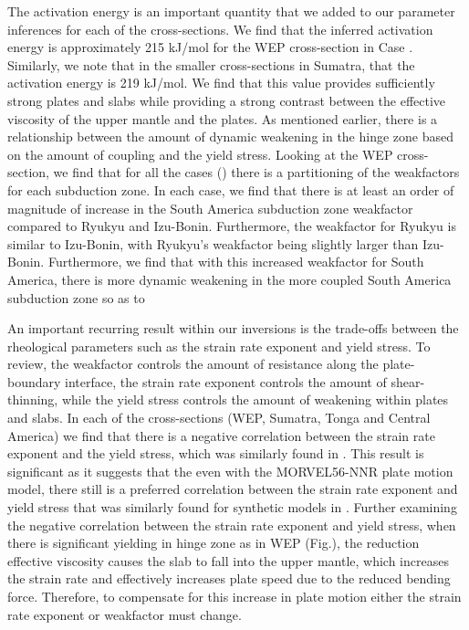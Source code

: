\documentclass[12pt]{article}
\begin{document}
  The activation energy is an important quantity that we added to our parameter inferences for each of the cross-sections. We find that the inferred activation energy is approximately 215 kJ/mol for the WEP cross-section in Case . Similarly, we note that in the smaller cross-sections in Sumatra, that the activation energy is 219 kJ/mol. We find that this value provides sufficiently strong plates and slabs while providing a strong contrast between the effective viscosity of the upper mantle and the plates. As mentioned earlier, there is a relationship between the amount of dynamic weakening in the hinge zone based on the amount of coupling and the yield stress. Looking at the WEP cross-section, we find that for all the cases () there is a partitioning of the weakfactors for each subduction zone. In each case, we find that there is at least an order of magnitude of increase in the South America subduction zone weakfactor compared to Ryukyu and Izu-Bonin. Furthermore, the weakfactor for Ryukyu is similar to Izu-Bonin, with Ryukyu's weakfactor being slightly larger than Izu-Bonin. Furthermore, we find that with this increased weakfactor for South America, there is more dynamic weakening in the more coupled South America subduction zone so as to 
  
  An important recurring result within our inversions is the trade-offs between the rheological parameters such as the strain rate exponent and yield stress. To review, the weakfactor controls the amount of resistance along the plate-boundary  interface, the strain rate exponent controls the amount of shear-thinning, while the yield stress controls the amount of weakening within plates and slabs. In each of the cross-sections (WEP, Sumatra, Tonga and Central America) we find that there is a negative correlation between the strain rate exponent and the yield stress, which was similarly found in \citep{ratnaswamy2015adjoint}. This result is significant as it suggests that the even with the MORVEL56-NNR plate motion model, there still is a preferred correlation between the strain rate exponent and yield stress that was similarly found for synthetic models in \citep{ratnaswamy2015adjoint}. Further examining the negative correlation between the strain rate exponent and yield stress, when there is significant yielding in hinge zone as in WEP (Fig.), the reduction effective viscosity causes the slab to fall into the upper mantle, which increases the strain rate and effectively increases plate speed due to the reduced bending force. Therefore, to compensate for this increase in plate motion either the strain rate exponent or weakfactor must change.
  
\end{document}
